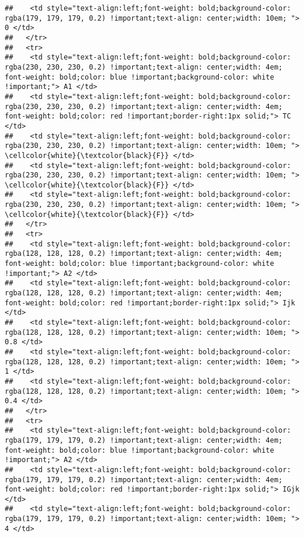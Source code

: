 \documentclass[
]{article}
\begin{document}
\begin{verbatim}
##    <td style="text-align:left;font-weight: bold;background-color: rgba(179, 179, 179, 0.2) !important;text-align: center;width: 10em; "> 0 </td>
##   </tr>
##   <tr>
##    <td style="text-align:left;font-weight: bold;background-color: rgba(230, 230, 230, 0.2) !important;text-align: center;width: 4em; font-weight: bold;color: blue !important;background-color: white !important;"> A1 </td>
##    <td style="text-align:left;font-weight: bold;background-color: rgba(230, 230, 230, 0.2) !important;text-align: center;width: 4em; font-weight: bold;color: red !important;border-right:1px solid;"> TC </td>
##    <td style="text-align:left;font-weight: bold;background-color: rgba(230, 230, 230, 0.2) !important;text-align: center;width: 10em; "> \cellcolor{white}{\textcolor{black}{F}} </td>
##    <td style="text-align:left;font-weight: bold;background-color: rgba(230, 230, 230, 0.2) !important;text-align: center;width: 10em; "> \cellcolor{white}{\textcolor{black}{F}} </td>
##    <td style="text-align:left;font-weight: bold;background-color: rgba(230, 230, 230, 0.2) !important;text-align: center;width: 10em; "> \cellcolor{white}{\textcolor{black}{F}} </td>
##   </tr>
##   <tr>
##    <td style="text-align:left;font-weight: bold;background-color: rgba(128, 128, 128, 0.2) !important;text-align: center;width: 4em; font-weight: bold;color: blue !important;background-color: white !important;"> A2 </td>
##    <td style="text-align:left;font-weight: bold;background-color: rgba(128, 128, 128, 0.2) !important;text-align: center;width: 4em; font-weight: bold;color: red !important;border-right:1px solid;"> Ijk </td>
##    <td style="text-align:left;font-weight: bold;background-color: rgba(128, 128, 128, 0.2) !important;text-align: center;width: 10em; "> 0.8 </td>
##    <td style="text-align:left;font-weight: bold;background-color: rgba(128, 128, 128, 0.2) !important;text-align: center;width: 10em; "> 1 </td>
##    <td style="text-align:left;font-weight: bold;background-color: rgba(128, 128, 128, 0.2) !important;text-align: center;width: 10em; "> 0.4 </td>
##   </tr>
##   <tr>
##    <td style="text-align:left;font-weight: bold;background-color: rgba(179, 179, 179, 0.2) !important;text-align: center;width: 4em; font-weight: bold;color: blue !important;background-color: white !important;"> A2 </td>
##    <td style="text-align:left;font-weight: bold;background-color: rgba(179, 179, 179, 0.2) !important;text-align: center;width: 4em; font-weight: bold;color: red !important;border-right:1px solid;"> IGjk </td>
##    <td style="text-align:left;font-weight: bold;background-color: rgba(179, 179, 179, 0.2) !important;text-align: center;width: 10em; "> 4 </td>

\end{verbatim}
\end{document}
